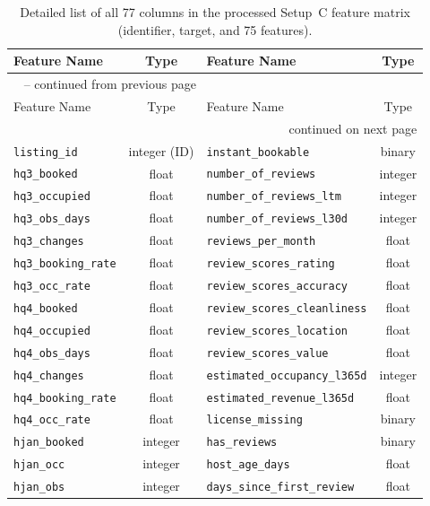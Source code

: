 \documentclass[review,12pt]{elsarticle}
\begin{document}
\footnotesize
\begin{longtable}{lc|lc}
\caption{Detailed list of all 77 columns in the processed Setup~C feature matrix (identifier, target, and 75 features).}
\label{tab:allfeat}\\
\toprule
Feature Name & Type & Feature Name & Type \\
\midrule
\endfirsthead
\multicolumn{4}{l}{\tablename\ \thetable{} -- continued from previous page}\\
\toprule
Feature Name & Type & Feature Name & Type \\
\midrule
\endhead
\midrule \multicolumn{4}{r}{continued on next page}\\
\endfoot
\bottomrule
\endlastfoot
\texttt{listing\_id} & integer (ID) & \texttt{instant\_bookable} & binary \\
\texttt{hq3\_booked} & float & \texttt{number\_of\_reviews} & integer \\
\texttt{hq3\_occupied} & float & \texttt{number\_of\_reviews\_ltm} & integer \\
\texttt{hq3\_obs\_days} & float & \texttt{number\_of\_reviews\_l30d} & integer \\
\texttt{hq3\_changes} & float & \texttt{reviews\_per\_month} & float \\
\texttt{hq3\_booking\_rate} & float & \texttt{review\_scores\_rating} & float \\
\texttt{hq3\_occ\_rate} & float & \texttt{review\_scores\_accuracy} & float \\
\texttt{hq4\_booked} & float & \texttt{review\_scores\_cleanliness} & float \\
\texttt{hq4\_occupied} & float & \texttt{review\_scores\_location} & float \\
\texttt{hq4\_obs\_days} & float & \texttt{review\_scores\_value} & float \\
\texttt{hq4\_changes} & float & \texttt{estimated\_occupancy\_l365d} & integer \\
\texttt{hq4\_booking\_rate} & float & \texttt{estimated\_revenue\_l365d} & float \\
\texttt{hq4\_occ\_rate} & float & \texttt{license\_missing} & binary \\
\texttt{hjan\_booked} & integer & \texttt{has\_reviews} & binary \\
\texttt{hjan\_occ} & integer & \texttt{host\_age\_days} & float \\
\texttt{hjan\_obs} & integer & \texttt{days\_since\_first\_review} & float \\

\end{longtable}
\end{document}
